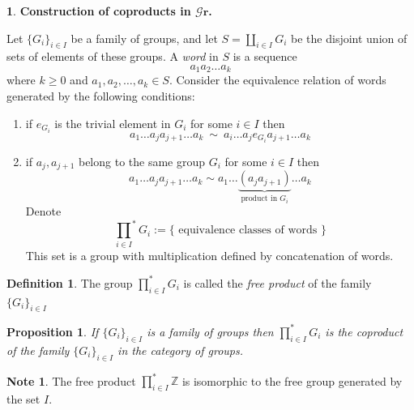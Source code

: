 \documentclass[12pt, letterpaper, oneside]{article}
\theoremstyle{plain}
\newtheorem{proposition}[theorem]{Proposition}
\theoremstyle{definition}
\newtheorem{definition}[theorem]{Definition}
\newtheorem{note}[theorem]{Note}
\newtheorem{nn}[theorem]{}
\newcommand{\Z}{{\mathbb Z}}
\newcommand{\Gr}{{\mathcal Gr}}
\newcommand{\benu}{\begin{enumerate}}
\newcommand{\eenu}{\end{enumerate}}
\newcommand{\vs}{\vskip 5mm}
\begin{document}
\begin{nn} \textbf{Construction of coproducts in $\boldsymbol\Gr$.} 

Let $\{G_{i}\}_{i\in I}$ be a family of groups, and let $S = \coprod_{i\in I} G_{i}$ be the disjoint union 
of sets of elements of these groups. A \emph{word} in $S$ is a sequence 
$$a_{1}a_{2}\dots a_{k}$$
where $k\geq 0$ and $a_{1}, a_{2}, \dots, a_{k}\in S$. Consider the equivalence relation of words 
generated by the following conditions:

\benu
\item if $e_{G_{i}}$ is the trivial element in $G_{i}$ for some $i\in I$ then
$$a_{1}\dots a_{j}a_{j+1}\dots a_{k} \  \sim \ a_{i}\dots a_{j}e_{G_{i}}a_{j+1}\dots a_{k}$$

\item if $a_{j}, a_{j+1}$ belong to the same group $G_{i}$ for some $i\in I$ then 
$$a_{1}\dots a_{j}a_{j+1} \dots a_{k} \sim 
a_{1}\dots \underbrace{(a_{j}a_{j+1})}_{\text{product in } G_{i}} \dots a_{k} $$
Denote
$${\prod_{i\in I}}^{\ast} G_{i} := \{  \text{ equivalence classes of words }   \}$$
This set is a group with multiplication defined by concatenation of words. 
\eenu

\end{nn}

\vs

\begin{definition}
The group $\prod^{\ast}_{i\in I} G_{i}$ is called the \emph{free product} of the family $\{G_{i}\}_{i\in I}$
\end{definition}

\vs

\begin{proposition}
If $\{G_{i}\}_{i\in I}$ is a family of groups then $\prod^{\ast}_{i\in I} G_{i}$ is the coproduct 
of the family $\{G_{i}\}_{i\in I}$ in the category of groups.
\end{proposition}

\vs

\begin{note}
The free product $\prod^{\ast}_{i\in I} \Z$ is isomorphic to the free group generated by the set $I$. 
\end{note}





\end{document}
